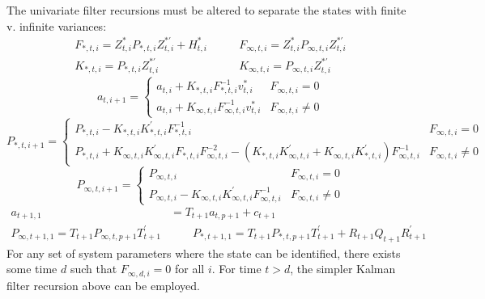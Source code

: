 \documentclass[12pt]{article}
\begin{document}
	The univariate filter recursions must be altered to separate the states with finite v. infinite variances: 
	\begin{align*}
	 F_{*,t,i} = Z_{t,i}^* P_{*,t,i} Z_{t,i}^{*\prime} + H_{t,i}^* &\qquad F_{\infty,t,i} = Z_{t,i}^* P_{\infty,t,i} Z_{t,i}^{*\prime}\\
	K_{*,t,i} = P_{*,t,i} Z_{t,i}^{*\prime} &\qquad K_{\infty,t,i} = P_{\infty,t,i} Z_{t,i}^{*\prime} 
	\end{align*}
	\begin{equation*}
	a_{t,i+1} = \begin{cases} 
	      a_{t,i} + K_{*,t,i} F_{*,t,i}^{-1} v_{t,i}^* & F_{\infty,t,i} = 0 \\
	      a_{t,i} + K_{\infty,t,i} F_{\infty,t,i}^{-1} v_{t,i}^* & F_{\infty,t,i} \neq 0
    \end{cases} 
    \end{equation*}
	\begin{equation*}
	P_{*,t,i+1} = \begin{cases} 
	   P_{*,t,i} - K_{*,t,i} K_{*,t,i}^\prime F_{*,t,i}^{-1} & F_{\infty,t,i} = 0 \\
	   P_{*,t,i} + K_{\infty,t,i} K_{\infty,t,i}^\prime F_{*,t,i} F_{\infty,t,i}^{-2} - (K_{*,t,i} K_{\infty,t,i}^\prime + K_{\infty,t,i} K_{*,t,i}^\prime) F_{\infty,t,i}^{-1} & F_{\infty,t,i} \neq 0
	\end{cases}
	\end{equation*}
	\begin{equation*}
	P_{\infty,t,i+1} = \begin{cases} 
	   P_{\infty,t,i} & F_{\infty,t,i} = 0 \\
	   P_{\infty,t,i} - K_{\infty,t,i} K_{\infty,t,i}^\prime F_{\infty,t,i}^{-1} & F_{\infty,t,i} \neq 0	   
	\end{cases} 
	\end{equation*}
	\begin{align*}
	a_{t+1,1} &= T_{t+1} a_{t, p+1} + c_{t+1} \\
	P_{\infty,t+1,1} = T_{t+1} P_{\infty,t,p+1} T_{t+1}^\prime &\qquad P_{*,t+1,1} = T_{t+1} P_{*,t,p+1} T_{t+1}^\prime + R_{t+1} Q_{t+1} R_{t+1}^\prime 
	\end{align*}
	For any set of system parameters where the state can be identified, there exists some time $d$ such that $F_{\infty,d,i} = 0$ for all $i$. For time $t > d$, the simpler Kalman filter recursion above can be employed. \\
\end{document}
